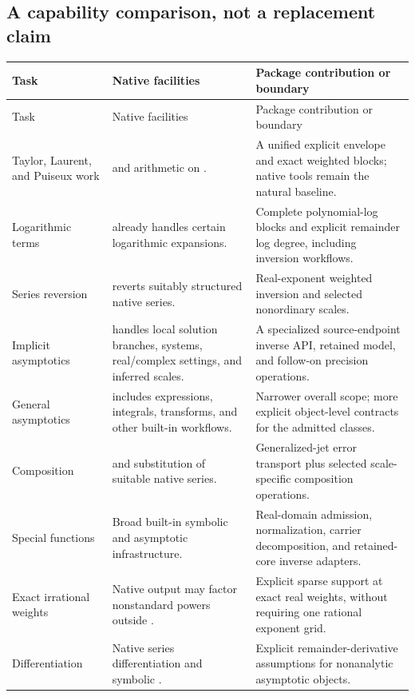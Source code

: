 \documentclass[11pt,a4paper]{article}
\newcommand{\code}[1]{\texttt{\detokenize{#1}}}
\begin{document}
\subsection{A capability comparison, not a replacement claim}
\begin{longtable}{@{}>{\raggedright\arraybackslash}p{}>{\raggedright\arraybackslash}p{}>{\raggedright\arraybackslash}p{}@{}}
\toprule Task & Native facilities & Package contribution or boundary\\\midrule\endfirsthead
\toprule Task & Native facilities & Package contribution or boundary\\\midrule\endhead
Taylor, Laurent, and Puiseux work & \code{Series} and arithmetic on \code{SeriesData}. & A unified explicit envelope and exact weighted blocks; native tools remain the natural baseline.\\
Logarithmic terms & \code{Series} already handles certain logarithmic expansions. & Complete polynomial-log blocks and explicit remainder log degree, including inversion workflows.\\
Series reversion & \code{InverseSeries} reverts suitably structured native series. & Real-exponent weighted inversion and selected nonordinary scales.\\
Implicit asymptotics & \code{AsymptoticSolve} handles local solution branches, systems, real/complex settings, and inferred scales. & A specialized source-endpoint inverse API, retained model, and follow-on precision operations.\\
General asymptotics & \code{Asymptotic} includes expressions, integrals, transforms, and other built-in workflows. & Narrower overall scope; more explicit object-level contracts for the admitted classes.\\
Composition & \code{ComposeSeries} and substitution of suitable native series. & Generalized-jet error transport plus selected scale-specific composition operations.\\
Special functions & Broad built-in symbolic and asymptotic infrastructure. & Real-domain admission, normalization, carrier decomposition, and retained-core inverse adapters.\\
Exact irrational weights & Native output may factor nonstandard powers outside \code{SeriesData}. & Explicit sparse support at exact real weights, without requiring one rational exponent grid.\\
Differentiation & Native series differentiation and symbolic \code{D}. & Explicit remainder-derivative assumptions for nonanalytic asymptotic objects.\\

\end{longtable}
\end{document}
